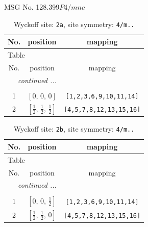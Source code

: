 \documentclass[fleqn,8pt]{jsarticle}
\begin{document}
\setcounter{MaxMatrixCols}{32}

\renewcommand{\tablename}{Table~}
\renewcommand{\figurename}{Figure~}
\begin{center}
\LARGE
MSG No. 128.399\quad$P4/mnc$
\end{center}
\renewcommand{\arraystretch}{1.2}
\begin{longtable}{ccc}
\caption{Wyckoff site: {\tt 2a}, site symmetry: {\tt 4/m..}}
 \\
 \hline \hline
No. & position & mapping \\ \hline \endfirsthead

\multicolumn{2}{l}{\tablename\ \thetable{}} \\
 \hline \hline
No. & position & mapping \\ \hline \endhead

 \hline \hline
\multicolumn{2}{r}{\footnotesize\it continued ...} \\ \endfoot

 \hline \hline
\multicolumn{2}{r}{} \\ \endlastfoot

1 & $\left[ 0,\, 0,\, 0 \right]$ & {\tt [1,2,3,6,9,10,11,14]} \\ \hline
2 & $\left[ \frac{1}{2},\, \frac{1}{2},\, \frac{1}{2} \right]$ & {\tt [4,5,7,8,12,13,15,16]} \\
\end{longtable}
\renewcommand{\arraystretch}{1.2}
\begin{longtable}{ccc}
\caption{Wyckoff site: {\tt 2b}, site symmetry: {\tt 4/m..}}
 \\
 \hline \hline
No. & position & mapping \\ \hline \endfirsthead

\multicolumn{2}{l}{\tablename\ \thetable{}} \\
 \hline \hline
No. & position & mapping \\ \hline \endhead

 \hline \hline
\multicolumn{2}{r}{\footnotesize\it continued ...} \\ \endfoot

 \hline \hline
\multicolumn{2}{r}{} \\ \endlastfoot

1 & $\left[ 0,\, 0,\, \frac{1}{2} \right]$ & {\tt [1,2,3,6,9,10,11,14]} \\ \hline
2 & $\left[ \frac{1}{2},\, \frac{1}{2},\, 0 \right]$ & {\tt [4,5,7,8,12,13,15,16]} \\
\end{longtable}
\end{document}
